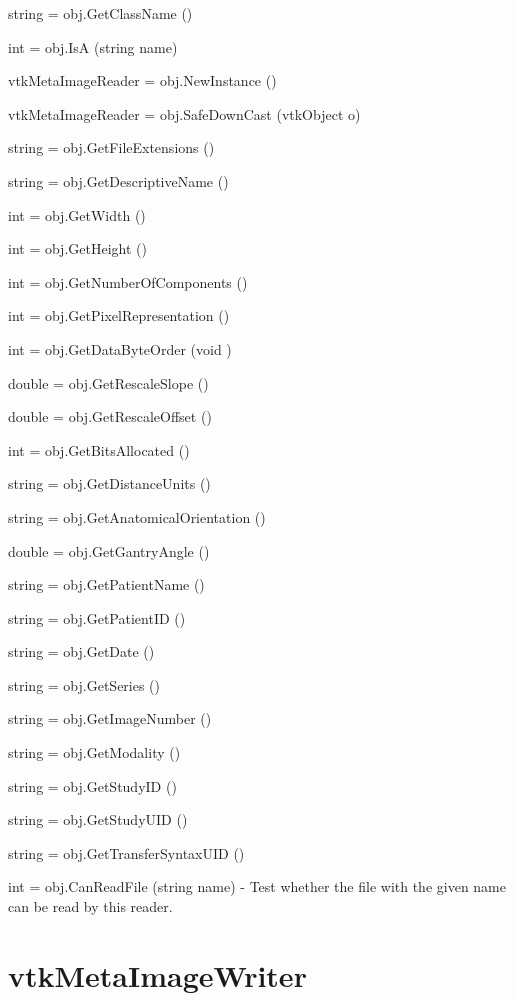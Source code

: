 \begin{DoxyItemize}
\item {\ttfamily string = obj.\-Get\-Class\-Name ()}  
\item {\ttfamily int = obj.\-Is\-A (string name)}  
\item {\ttfamily vtk\-Meta\-Image\-Reader = obj.\-New\-Instance ()}  
\item {\ttfamily vtk\-Meta\-Image\-Reader = obj.\-Safe\-Down\-Cast (vtk\-Object o)}  
\item {\ttfamily string = obj.\-Get\-File\-Extensions ()}  
\item {\ttfamily string = obj.\-Get\-Descriptive\-Name ()}  
\item {\ttfamily int = obj.\-Get\-Width ()}  
\item {\ttfamily int = obj.\-Get\-Height ()}  
\item {\ttfamily int = obj.\-Get\-Number\-Of\-Components ()}  
\item {\ttfamily int = obj.\-Get\-Pixel\-Representation ()}  
\item {\ttfamily int = obj.\-Get\-Data\-Byte\-Order (void )}  
\item {\ttfamily double = obj.\-Get\-Rescale\-Slope ()}  
\item {\ttfamily double = obj.\-Get\-Rescale\-Offset ()}  
\item {\ttfamily int = obj.\-Get\-Bits\-Allocated ()}  
\item {\ttfamily string = obj.\-Get\-Distance\-Units ()}  
\item {\ttfamily string = obj.\-Get\-Anatomical\-Orientation ()}  
\item {\ttfamily double = obj.\-Get\-Gantry\-Angle ()}  
\item {\ttfamily string = obj.\-Get\-Patient\-Name ()}  
\item {\ttfamily string = obj.\-Get\-Patient\-I\-D ()}  
\item {\ttfamily string = obj.\-Get\-Date ()}  
\item {\ttfamily string = obj.\-Get\-Series ()}  
\item {\ttfamily string = obj.\-Get\-Image\-Number ()}  
\item {\ttfamily string = obj.\-Get\-Modality ()}  
\item {\ttfamily string = obj.\-Get\-Study\-I\-D ()}  
\item {\ttfamily string = obj.\-Get\-Study\-U\-I\-D ()}  
\item {\ttfamily string = obj.\-Get\-Transfer\-Syntax\-U\-I\-D ()}  
\item {\ttfamily int = obj.\-Can\-Read\-File (string name)} -\/ Test whether the file with the given name can be read by this reader.  
\end{DoxyItemize}\hypertarget{vtkio_vtkmetaimagewriter}{}\section{vtk\-Meta\-Image\-Writer}\label{vtkio_vtkmetaimagewriter}
